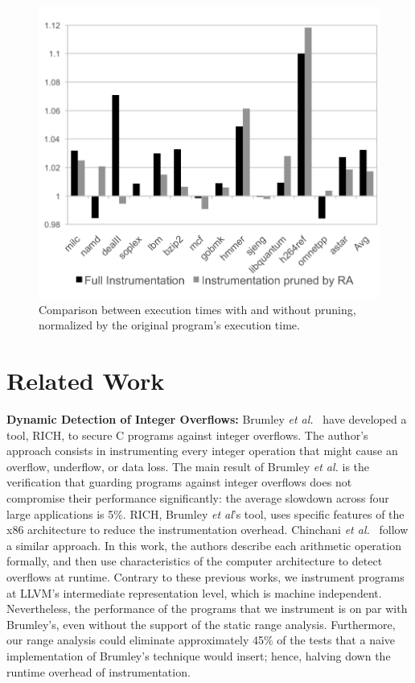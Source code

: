 \documentclass{sigplanconf}[10pt]
\begin{document}
\begin{figure}[t!]
\begin{center}
\includegraphics[width=\columnwidth]{images/spec_runtime}
\end{center}
\caption{\label{fig:spec_runtime}
Comparison between execution times with and without pruning, 
normalized by the original program's execution time.}
\end{figure}


\section{Related Work}
\label{sec:rel}

\noindent
\textbf{Dynamic Detection of Integer Overflows: }
Brumley {\em et al.}~\cite{Brumley07} have developed a tool, RICH, to
secure C programs against integer overflows.
The author's approach consists in instrumenting every integer operation that
might cause an overflow, underflow, or data loss.
The main result of Brumley {\em et al.} is the verification that guarding programs
against integer overflows does not compromise their
performance significantly: the average slowdown across four large applications
is 5\%.
RICH, Brumley {\em et al}'s tool, uses specific features of the x86 architecture
to reduce the instrumentation overhead.
Chinchani {\em et al.}~\cite{Chinchani04} follow a similar approach.
In this work, the authors describe each arithmetic operation formally, and then
use characteristics of the computer architecture to detect overflows at
runtime.
Contrary to these previous works, we instrument programs at LLVM's intermediate
representation level, which is machine independent.
Nevertheless, the performance of the programs that we instrument is on par with
Brumley's, even without the support of the static range analysis.
Furthermore, our range analysis could eliminate approximately
45\% of the tests that a naive implementation of Brumley's technique
would insert; hence, halving down the runtime overhead of instrumentation.
\end{document}
